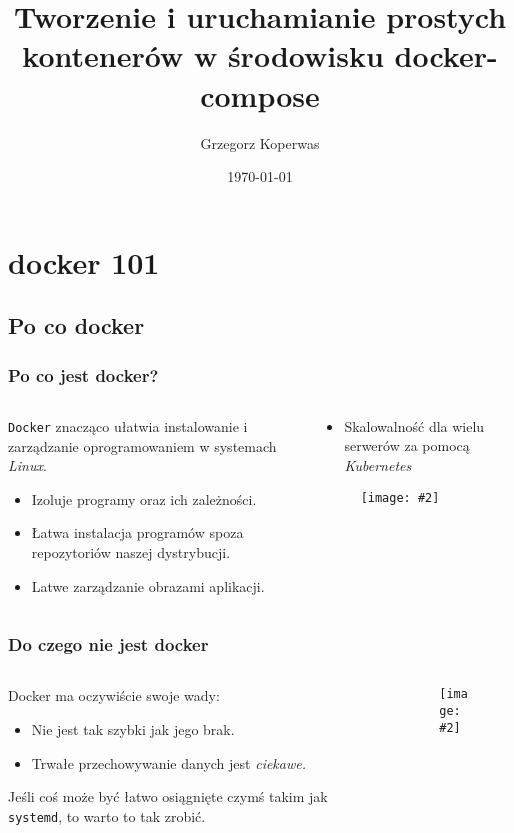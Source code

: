\documentclass[aspectratio=169]{beamer}
\title[docker oraz docker-compose 101]{Tworzenie i uruchamianie prostych kontenerów w środowisku  docker-compose}
\author{Grzegorz Koperwas}
\date{\today}
\newcommand{\obrazek}[2]{
\begin{figure}[h]
    \centering
    \texttt{[image: \#2]}
\end{figure}
}
\begin{document}
\begin{frame}
    \titlepage
\end{frame}
\begin{frame}
    \tableofcontents
\end{frame}
\section{docker 101}
\subsection{Po co docker}
\begin{frame}
    \frametitle{Po co jest docker?}

    \begin{columns}
        \begin{column}{0.5\textwidth}
            \texttt{Docker} znacząco ułatwia instalowanie i zarządzanie oprogramowaniem w systemach \emph{Linux}.
            \pause
            \begin{itemize}
                \item Izoluje programy oraz ich zależności.
                \pause
                \item Łatwa instalacja programów spoza repozytoriów naszej dystrybucji.
                \pause
                \item Latwe zarządzanie obrazami aplikacji.
            \end{itemize}
        \end{column}
        \begin{column}{0.5\textwidth}
            \pause
            \begin{itemize}
                \item Skalowalność dla wielu serwerów za pomocą \emph{Kubernetes}
            \end{itemize}
            \pause[0]
            \obrazek{0.27}{docker-arch.png}
        \end{column}
    \end{columns}
\end{frame}
\begin{frame}
    \frametitle{Do czego nie jest docker}
    \begin{columns}
        \begin{column}{0.5\textwidth}
            Docker ma oczywiście swoje wady:
            \pause
            \begin{itemize}
                \item Nie jest tak szybki jak jego brak.
                \pause
                \item Trwałe przechowywanie danych jest \emph{ciekawe.}
            \end{itemize}
            \pause
            Jeśli coś może być łatwo osiągnięte czymś takim jak \texttt{systemd}, to warto to tak zrobić.
        \end{column}
        \begin{column}{0.5\textwidth}
            \obrazek{0.15}{systemD.png}
        \end{column}
    \end{columns}
\end{frame}
\end{document}
